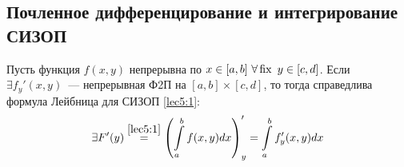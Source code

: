 \documentclass[../../main.tex]{subfiles}
\begin{document}
\subsection{Почленное дифференцирование и интегрирование СИЗОП}

\begin{thm}
	Пусть функция $ f(x, y) $ непрерывна по $ x \in [a, b]\ 
	\forall \fix\ y \in [c, d] $. Если $ \exists f_y'(x, y) $~---
	непрерывная Ф2П на $ [a, b] \times [c, d] $, то тогда справедлива формула
	Лейбница для СИЗОП \eqref{lec5:1}:
	\begin{equation}
		\label{lec6:8}
		\exists F'(y) \stackrel{\eqref{lec5:1}}{=} \left(
		\int\limits_a^b f(x, y) dx
		\right)_y' = \int\limits_a^b f_y'(x, y)dx
	\end{equation}
\end{thm}
\end{document}
